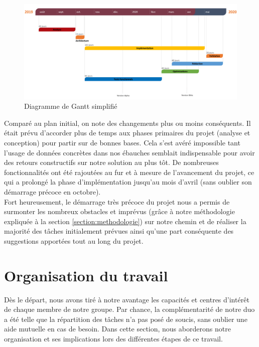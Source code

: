 \begin{figure}[H]
    \includegraphics[width=\textwidth,height=\textheight,keepaspectratio]{images/planning.png}
    \centering
    \caption{Diagramme de Gantt simplifié}
    \label{pic:ganttChart}
\end{figure}

Comparé au plan initial, on note des changements plus ou moins conséquents. Il était prévu d'accorder plus de temps aux phases primaires du projet (analyse et conception) pour partir sur de bonnes bases. Cela s'est avéré impossible tant l'usage de données concrètes dans nos ébauches semblait indispensable pour avoir des retours constructifs sur notre solution au plus tôt. De nombreuses fonctionnalités ont été rajoutées au fur et à mesure de l'avancement du projet, ce qui a prolongé la phase d'implémentation jusqu'au mois d'avril (sans oublier son démarrage précoce en octobre). \\

Fort heureusement, le démarrage très précoce du projet nous a permis de surmonter les nombreux obstacles et imprévus (grâce à notre méthodologie expliquée à la section \ref{section:methodologie}) sur notre chemin et de réaliser la majorité des tâches initialement prévues ainsi qu'une part conséquente des suggestions apportées tout au long du projet. \\


\section{Organisation du travail}

Dès le départ, nous avons tiré à notre avantage les capacités et centres d'intérêt de chaque membre de notre groupe. Par chance, la complémentarité de notre duo a été telle que la répartition des tâches n'a pas posé de soucis, sans oublier une aide mutuelle en cas de besoin. Dans cette section, nous aborderons notre organisation et ses implications lors des différentes étapes de ce travail.\\

